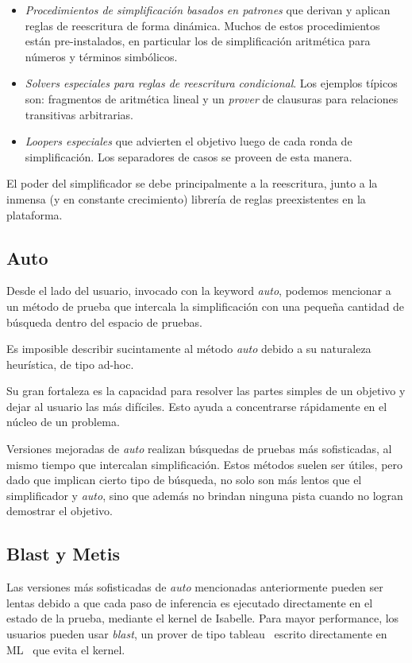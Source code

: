 \documentclass[12pt]{book}
\begin{document}
\begin{itemize}
	\item \textit{Procedimientos de simplificación basados en patrones} que derivan y aplican reglas de reescritura de forma dinámica. Muchos de estos procedimientos están pre-instalados, en particular los de simplificación aritmética para números y términos simbólicos.
	\item \textit{Solvers especiales para reglas de reescritura condicional}. Los ejemplos típicos son: fragmentos de aritmética lineal y un \textit{prover} de clausuras para relaciones transitivas arbitrarias.
	\item \textit{\textit{Loopers} especiales} que advierten el objetivo luego de cada ronda de simplificación. Los separadores de casos se proveen de esta manera.
\end{itemize}

El poder del simplificador se debe principalmente a la reescritura, junto a la inmensa (y en constante crecimiento) librería de reglas preexistentes en la plataforma.


\subsection{Auto}\label{sec:auto}

Desde el lado del usuario, invocado con la keyword \textit{auto}, podemos mencionar a un método de prueba que intercala la simplificación con una pequeña cantidad de búsqueda dentro del espacio de pruebas.

Es imposible describir sucintamente al método \textit{auto} debido a su naturaleza heurística, de tipo ad-hoc.

Su gran fortaleza es la capacidad para resolver las partes simples de un objetivo y dejar al usuario las más difíciles. Esto ayuda a concentrarse rápidamente en el núcleo de un problema.

Versiones mejoradas de \textit{auto} realizan búsquedas de pruebas más sofisticadas, al mismo tiempo que intercalan simplificación. Estos métodos suelen ser útiles, pero dado que implican cierto tipo de búsqueda, no solo son más lentos que el simplificador y \textit{auto}, sino que además no brindan ninguna pista cuando no logran demostrar el objetivo.


\subsection{Blast y Metis}
Las versiones más sofisticadas de \textit{auto} mencionadas anteriormente pueden ser lentas debido a que cada paso de inferencia es ejecutado directamente en el estado de la prueba, mediante el kernel de Isabelle.
Para mayor performance, los usuarios pueden usar \textit{blast}, un prover de tipo tableau~\cite{tableau_provers} escrito directamente en ML~\cite{ML_programming_language} que evita el kernel.
\end{document}

